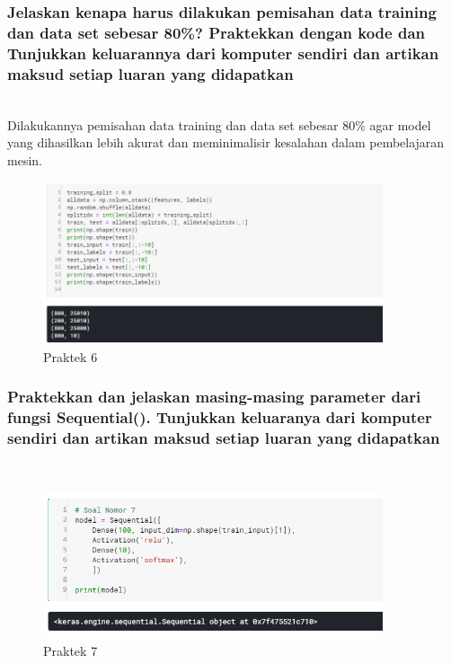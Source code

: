  	 
\subsubsection{Jelaskan kenapa harus dilakukan pemisahan data training dan data set sebesar 80\%? Praktekkan dengan kode dan Tunjukkan keluarannya dari komputer sendiri dan artikan maksud setiap luaran yang didapatkan}
\hfill\\
Dilakukannya pemisahan data training dan data set sebesar 80\% agar model yang dihasilkan lebih akurat dan meminimalisir kesalahan dalam pembelajaran mesin.

	
	
	\begin{figure}[H]
		\begin{center}
		 \includegraphics[width=10cm]{figures/1174076/figures6/praktek6.png}
		 \caption{Praktek 6}	
		\end{center}
	\end{figure}
 
\subsubsection{Praktekkan dan jelaskan masing-masing parameter dari fungsi Sequential(). Tunjukkan keluaranya dari komputer sendiri dan artikan maksud setiap luaran yang didapatkan}
\hfill\\


	 
	\begin{figure}[H]
		\begin{center}
		 \includegraphics[width=10cm]{figures/1174076/figures6/praktek7.png}
		 \caption{Praktek 7}	
		\end{center}
	\end{figure}
 
